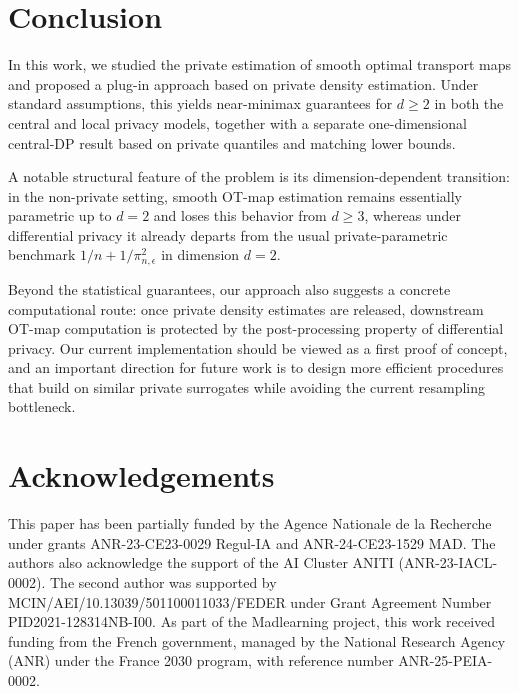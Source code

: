 \documentclass{article}
\newcommand{\1}{\mathds{1}}
\theoremstyle{plain}
\theoremstyle{definition}
\theoremstyle{remark}
\begin{document}
\vspace{-0.5cm}
\section{Conclusion}

In this work, we studied the private estimation of smooth optimal transport maps and proposed a plug-in approach based on private density estimation. Under standard assumptions, this yields near-minimax guarantees for $d \ge 2$ in both the central and local privacy models, together with a separate one-dimensional central-DP result based on private quantiles and matching lower bounds. 

A notable structural feature of the problem is its dimension-dependent transition: in the non-private setting, smooth OT-map estimation remains essentially parametric up to $d=2$ and loses this behavior from $d \ge 3$, whereas under differential privacy it already departs from the usual private-parametric benchmark $1/n + 1/\pi_{n,\epsilon}^2$ in dimension $d=2$.

Beyond the statistical guarantees, our approach also suggests a concrete computational route: once private density estimates are released, downstream OT-map computation is protected by the post-processing property of differential privacy. Our current implementation should be viewed as a first proof of concept, and an important direction for future work is to design more efficient procedures that build on similar private surrogates while avoiding the current resampling bottleneck.

\section*{Acknowledgements}

This paper has been partially funded by the Agence Nationale de la Recherche under grants
ANR-23-CE23-0029 Regul-IA and ANR-24-CE23-1529 MAD.
The authors also acknowledge the support of the AI Cluster ANITI (ANR-23-IACL-0002).
The second author was supported by MCIN/AEI/10.13039/501100011033/FEDER under Grant Agreement
Number PID2021-128314NB-I00.  
As part of the Madlearning project, this work received funding from the French government, managed by the National Research Agency (ANR) under the France 2030 program, with reference number ANR-25-PEIA-0002.




\newpage




\end{document}
